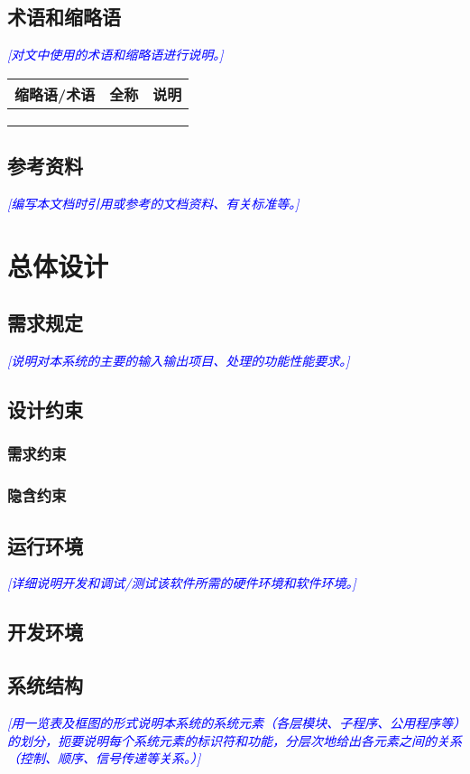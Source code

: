 \documentclass[UTF8]{ctexart}
\newcommand{\note}[1]{\textcolor{blue}{\emph{[#1]}}}   %
\begin{document}
    \subsection{术语和缩略语} 
    \note{对文中使用的术语和缩略语进行说明。}\\
      \begin{tabular}{p{70pt} p{80pt} p{120pt} }
       \hline
       \hline
       缩略语/术语 & 全称 & 说明\\  %
       \hline
       \\
       \hline
       \\
       \hline
       \\
       \hline
       \hline
     \end{tabular}
    \subsection{参考资料} 
    \note{编写本文档时引用或参考的文档资料、有关标准等。}
    \newpage
    \section{总体设计}  %
    \subsection{需求规定} 
    \note{说明对本系统的主要的输入输出项目、处理的功能性能要求。}
    \subsection{设计约束}
     \subsubsection{需求约束}
     \subsubsection{隐含约束}
    \subsection{运行环境}
    \note{详细说明开发和调试/测试该软件所需的硬件环境和软件环境。}
    \subsection{开发环境}   
    \subsection{系统结构} %
    \note{用一览表及框图的形式说明本系统的系统元素（各层模块、子程序、公用程序等）的划分，扼要说明每个系统元素的标识符和功能，分层次地给出各元素之间的关系（控制、顺序、信号传递等关系。）}
\end{document}
